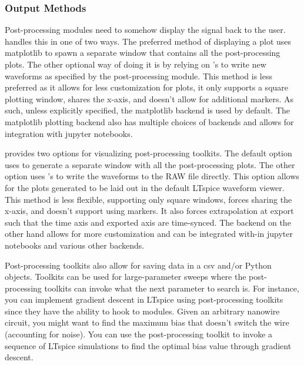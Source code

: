 
\subsubsection{Output Methods}

Post-processing modules need to somehow display the signal back to the user.  handles this
in one of two ways. The preferred method of displaying a plot uses matplotlib to spawn a separate window
that contains all the post-processing plots. The other optional way of doing it is by relying on 
's  to write new waveforms as specified by the post-processing module.
This method is less preferred as it allows for less customization for plots, it only supports a square
plotting window, shares the x-axis, and doesn't allow for additional markers. As such, unless explicitly
specified, the matplotlib backend is used by default. The matplotlib plotting backend also has multiple 
choices of backends and allows for integration with jupyter notebooks. 

 provides two options for visualizing post-processing toolkits. The default
option uses  to generate a separate window with all the post-processing
plots. The other option uses 's  to write the waveforms
to the RAW file directly. This option allows for the plots generated to be laid out in the
default LTspice waveform viewer. This method is less flexible, supporting only square 
windows, forces sharing the x-axis, and doesn't support using markers. It also forces
extrapolation at export such that the time axis and exported axis are time-synced.
The  backend on the other hand allows for more customization and 
can be integrated with-in jupyter notebooks and various other  backends.

Post-processing toolkits also allow for saving data in a csv and/or Python objects. 
Toolkits can be used for large-parameter sweeps where the post-processing toolkits
can invoke what the next parameter to search is. For instance, you can implement
gradient descent in LTspice using post-processing toolkits since they have the ability
to hook to modules. Given an arbitrary nanowire circuit, you might want to find the
maximum bias that doesn't switch the wire (accounting for noise). You can use 
the post-processing toolkit to invoke a sequence of LTspice simulations to find
the optimal bias value through gradient descent.

